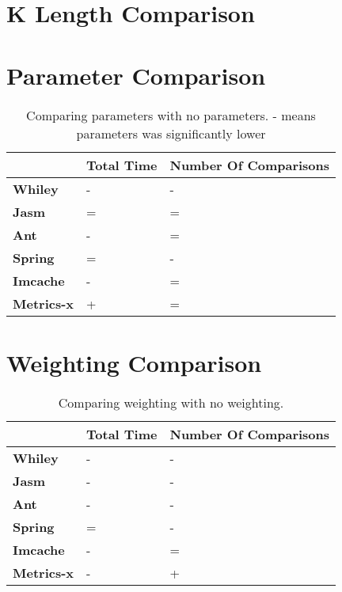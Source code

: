 \section{K Length Comparison}



\section{Parameter Comparison}

\begin{table}[]
\centering
\caption{Comparing parameters with no parameters. - means parameters was significantly lower}
\label{my-label}
\begin{tabular}{|l|l|l|}
\hline
{\bf }          & {\bf Total Time} & {\bf Number Of Comparisons} \\ \hline
{\bf Whiley}    & -                & -                           \\ \hline
{\bf Jasm}      & =                & =                           \\ \hline
{\bf Ant}       & -                & =                           \\ \hline
{\bf Spring}    & =                & -                           \\ \hline
{\bf Imcache}   & -                & =                           \\ \hline
{\bf Metrics-x} & +                & =                           \\ \hline
\end{tabular}
\end{table}

\section{Weighting Comparison}

\begin{table}[]
\centering
\caption{Comparing weighting with no weighting.}
\label{my-label}
\begin{tabular}{|l|l|l|}
\hline
{\bf }          & {\bf Total Time} & {\bf Number Of Comparisons} \\ \hline
{\bf Whiley}    & -                & -                           \\ \hline
{\bf Jasm}      & -                & -                           \\ \hline
{\bf Ant}       & -                & -                           \\ \hline
{\bf Spring}    & =                & -                           \\ \hline
{\bf Imcache}   & -                & =                           \\ \hline
{\bf Metrics-x} & -                & +                           \\ \hline
\end{tabular}
\end{table}

